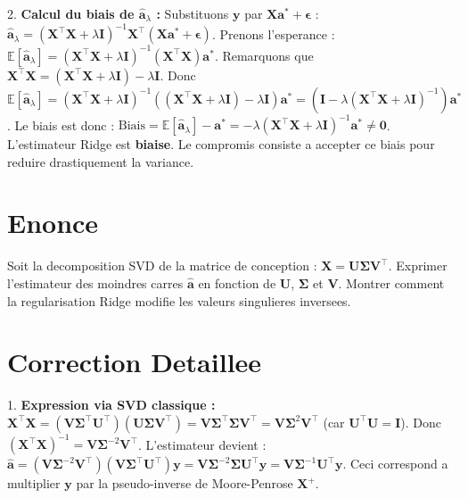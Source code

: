 \documentclass[11pt,a4paper]{report}
\begin{document}
2. \textbf{Calcul du biais de $\hat{\mathbf{a}}_\lambda$ :}
   Substituons $\mathbf{y}$ par $\mathbf{X}\mathbf{a}^* + \boldsymbol{\epsilon}$ :
   $\hat{\mathbf{a}}_\lambda = (\mathbf{X}^\top\mathbf{X} + \lambda \mathbf{I})^{-1}\mathbf{X}^\top(\mathbf{X}\mathbf{a}^* + \boldsymbol{\epsilon})$.
   Prenons l'esperance :
   $\mathbb{E}[\hat{\mathbf{a}}_\lambda] = (\mathbf{X}^\top\mathbf{X} + \lambda \mathbf{I})^{-1}(\mathbf{X}^\top\mathbf{X})\mathbf{a}^*$.
   Remarquons que $\mathbf{X}^\top\mathbf{X} = (\mathbf{X}^\top\mathbf{X} + \lambda \mathbf{I}) - \lambda \mathbf{I}$.
   Donc $\mathbb{E}[\hat{\mathbf{a}}_\lambda] = (\mathbf{X}^\top\mathbf{X} + \lambda \mathbf{I})^{-1}((\mathbf{X}^\top\mathbf{X} + \lambda \mathbf{I}) - \lambda \mathbf{I})\mathbf{a}^* = (\mathbf{I} - \lambda(\mathbf{X}^\top\mathbf{X} + \lambda \mathbf{I})^{-1})\mathbf{a}^*$.
   Le biais est donc : $\text{Biais} = \mathbb{E}[\hat{\mathbf{a}}_\lambda] - \mathbf{a}^* = -\lambda(\mathbf{X}^\top\mathbf{X} + \lambda \mathbf{I})^{-1}\mathbf{a}^* \neq \mathbf{0}$.
   L'estimateur Ridge est \textbf{biaise}. Le compromis consiste a accepter ce biais pour reduire drastiquement la variance.

\section{Enonce}
Soit la decomposition SVD de la matrice de conception : $\mathbf{X} = \mathbf{U} \mathbf{\Sigma} \mathbf{V}^\top$.
Exprimer l'estimateur des moindres carres $\hat{\mathbf{a}}$ en fonction de $\mathbf{U}$, $\mathbf{\Sigma}$ et $\mathbf{V}$. Montrer comment la regularisation Ridge modifie les valeurs singulieres inversees.

\section{Correction Detaillee}
1. \textbf{Expression via SVD classique :}
   $\mathbf{X}^\top\mathbf{X} = (\mathbf{V} \mathbf{\Sigma}^\top \mathbf{U}^\top)(\mathbf{U} \mathbf{\Sigma} \mathbf{V}^\top) = \mathbf{V} \mathbf{\Sigma}^\top \mathbf{\Sigma} \mathbf{V}^\top = \mathbf{V} \mathbf{\Sigma}^2 \mathbf{V}^\top$ (car $\mathbf{U}^\top\mathbf{U} = \mathbf{I}$).
   Donc $(\mathbf{X}^\top\mathbf{X})^{-1} = \mathbf{V} \mathbf{\Sigma}^{-2} \mathbf{V}^\top$.
   L'estimateur devient : $\hat{\mathbf{a}} = (\mathbf{V} \mathbf{\Sigma}^{-2} \mathbf{V}^\top) (\mathbf{V} \mathbf{\Sigma}^\top \mathbf{U}^\top) \mathbf{y} = \mathbf{V} \mathbf{\Sigma}^{-2} \mathbf{\Sigma} \mathbf{U}^\top \mathbf{y} = \mathbf{V} \mathbf{\Sigma}^{-1} \mathbf{U}^\top \mathbf{y}$.
   Ceci correspond a multiplier $\mathbf{y}$ par la pseudo-inverse de Moore-Penrose $\mathbf{X}^+$.
\end{document}
